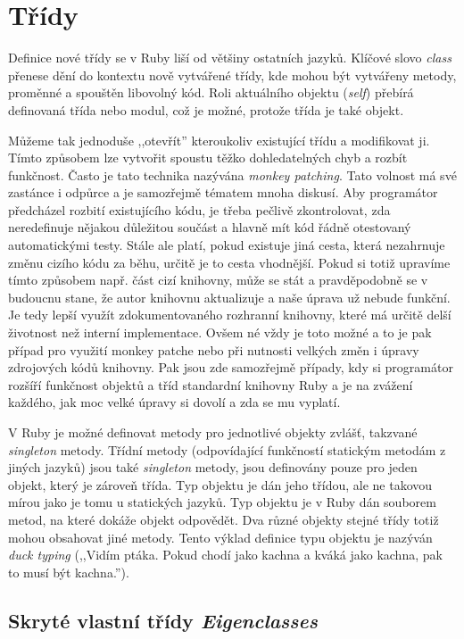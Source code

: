 \documentclass[12pt,a4paper,oneside]{article}
\begin{document}
\section{Třídy}

Definice nové třídy se v Ruby liší od většiny ostatních jazyků. Klíčové slovo \emph{class} přenese dění do kontextu nově vytvářené třídy, kde mohou být vytvářeny metody, proměnné a spouštěn libovolný kód. Roli aktuálního objektu (\emph{self}) přebírá definovaná třída nebo modul, což je možné, protože třída je také objekt.

Můžeme tak jednoduše ,,otevřít'' kteroukoliv existující třídu a modifikovat ji. Tímto způsobem lze vytvořit spoustu těžko dohledatelných chyb a rozbít funkčnost. Často je tato technika nazývána \emph{monkey patching}. Tato volnost má své zastánce i odpůrce a je samozřejmě tématem mnoha diskusí. Aby programátor předcházel rozbití existujícího kódu, je třeba pečlivě zkontrolovat, zda neredefinuje nějakou důležitou součást a hlavně mít kód řádně otestovaný automatickými testy. Stále ale platí, pokud existuje jiná cesta, která nezahrnuje změnu cizího kódu za běhu, určitě je to cesta vhodnější. Pokud si totiž upravíme tímto způsobem např. část cizí knihovny, může se stát a pravděpodobně se v budoucnu stane, že autor knihovnu aktualizuje a naše úprava už nebude funkční. Je tedy lepší využít zdokumentovaného rozhranní knihovny, které má určitě delší životnost než interní implementace. Ovšem né vždy je toto možné a to je pak případ pro využití monkey patche nebo při nutnosti velkých změn i úpravy zdrojových kódů knihovny. Pak jsou zde samozřejmě případy, kdy si programátor rozšíří funkčnost objektů a tříd standardní knihovny Ruby a je na zvážení každého, jak moc velké úpravy si dovolí a zda se mu vyplatí.

V Ruby je možné definovat metody pro jednotlivé objekty zvlášť, takzvané \emph{singleton} metody. Třídní metody (odpovídající funkčností statickým metodám z jiných jazyků) jsou také \emph{singleton} metody, jsou definovány pouze pro jeden objekt, který je zároveň třída. Typ objektu je dán jeho třídou, ale ne takovou mírou jako je tomu u statických jazyků. Typ objektu je v Ruby dán souborem metod, na které dokáže objekt odpovědět. Dva různé objekty stejné třídy totiž mohou obsahovat jiné metody. Tento výklad definice typu objektu je nazýván \emph{duck typing} (,,Vidím ptáka. Pokud chodí jako kachna a kváká jako kachna, pak to musí být kachna.''). 

\subsection{Skryté vlastní třídy \emph{Eigenclasses}}
\end{document}
